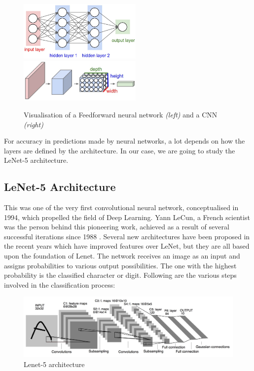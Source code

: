 \begin{figure}[h!]
\centering
\includegraphics[width=6cm]{figures/Neural_Net.png}
\hspace{7mm}
\includegraphics[width=6cm]{figures/cnn.png}
\caption{Visualisation of a Feedforward neural network \textit{(left)} and a CNN \textit{(right)}}
\label{fig:cnn6}
\end{figure}

For accuracy in predictions made by neural networks, a lot depends on how the layers are defined by the architecture. In our case, we are going to study the LeNet-5 architecture. 

\subsection*{LeNet-5 Architecture}
\label{sect5_1_2_1a}

This was one of the very first convolutional neural network, conceptualised in 1994, which propelled the field of Deep Learning. Yann LeCun, a French scientist was the person behind this pioneering work, achieved as a result of several successful iterations since 1988 \cite{cnn_culurciello}. Several new architectures have been proposed in the recent years which have improved features over LeNet, but they are all based upon the foundation of Lenet. \newline\newline
The network receives an image as an input and assigns probabilities to various output possibilities. The one with the highest probability is the classified character or digit. Following are the various steps involved in the classification process:
\begin{figure}[h!]
\centering
\includegraphics[width=\linewidth]{figures/Lenet5.png}
\caption{Lenet-5 architecture}
\label{fig:cnn7}
\end{figure}

